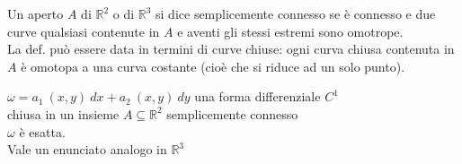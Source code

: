 \documentclass[a4paper, oneside]{article}
\begin{document}
\begin{definition}
    Un aperto $A$ di $\mathbb{R}^2$ o di $\mathbb{R}^3$ si dice semplicemente connesso se è connesso e due curve qualsiasi contenute in $A$ e aventi gli stessi estremi sono omotrope.\\
    La def. può essere data in termini di curve chiuse: ogni curva chiusa contenuta in $A$ è omotopa a una curva costante (cioè che si riduce ad un solo punto).
\end{definition}


\begin{theorem}
     $\omega= a_1 \ (x,y) \ dx + a_2 \ (x,y) \ dy$ una forma differenziale $C^1$\\
     chiusa in un insieme $A \subseteq \mathbb{R}^2$ semplicemente connesso\\
     $\omega$ è esatta.\\
    Vale un enunciato analogo in $\mathbb{R}^3$
    \begin{center}
    \end{center}
\end{theorem}
\end{document}
